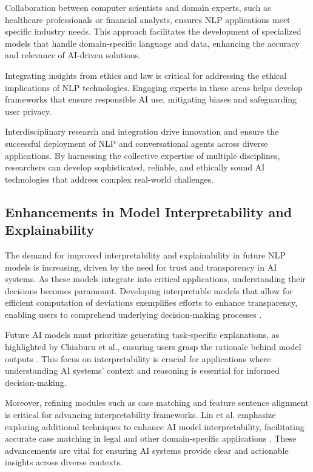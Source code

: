 Collaboration between computer scientists and domain experts, such as healthcare professionals or financial analysts, ensures NLP applications meet specific industry needs. This approach facilitates the development of specialized models that handle domain-specific language and data, enhancing the accuracy and relevance of AI-driven solutions.

Integrating insights from ethics and law is critical for addressing the ethical implications of NLP technologies. Engaging experts in these areas helps develop frameworks that ensure responsible AI use, mitigating biases and safeguarding user privacy.

Interdisciplinary research and integration drive innovation and ensure the successful deployment of NLP and conversational agents across diverse applications. By harnessing the collective expertise of multiple disciplines, researchers can develop sophisticated, reliable, and ethically sound AI technologies that address complex real-world challenges.

\subsection{Enhancements in Model Interpretability and Explainability} \label{subsec:Enhancements in Model Interpretability and Explainability}

The demand for improved interpretability and explainability in future NLP models is increasing, driven by the need for trust and transparency in AI systems. As these models integrate into critical applications, understanding their decisions becomes paramount. Developing interpretable models that allow for efficient computation of deviations exemplifies efforts to enhance transparency, enabling users to comprehend underlying decision-making processes \cite{wei2022safetyinterpretablemachinelearning}.

Future AI models must prioritize generating task-specific explanations, as highlighted by Chiaburu et al., ensuring users grasp the rationale behind model outputs \cite{chiaburu2024copronnconceptbasedprototypicalnearest}. This focus on interpretability is crucial for applications where understanding AI systems' context and reasoning is essential for informed decision-making.

Moreover, refining modules such as case matching and feature sentence alignment is critical for advancing interpretability frameworks. Lin et al. emphasize exploring additional techniques to enhance AI model interpretability, facilitating accurate case matching in legal and other domain-specific applications \cite{lin2023interpretabilityframeworksimilarcase}. These advancements are vital for ensuring AI systems provide clear and actionable insights across diverse contexts.

